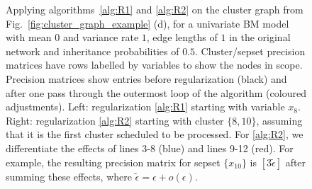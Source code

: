 \begin{figure}[t]
    \centering
    \caption{Applying algorithms~\ref{alg:R1} and \ref{alg:R2} on the cluster graph from Fig.~\ref{fig:cluster_graph_example} (d), for a univariate BM model with mean $0$ and variance rate $1$, edge lengths of $1$ in the original network and inheritance probabilities of $0.5$. Cluster/sepset precision matrices have rows labelled by variables to show the nodes in scope. Precision matrices show entries before regularization (black) and after one pass through the outermost loop of the algorithm (coloured adjustments). Left: regularization \ref{alg:R1} starting with variable $x_8$. Right: regularization \ref{alg:R2} starting with cluster $\{8, 10\}$, assuming that it is the first cluster scheduled to be processed. For \ref{alg:R2}, we differentiate the effects of lines 3-8 (blue) and lines 9-12 (red). For example, the resulting precision matrix for sepset $\{x_{10}\}$ is $[3\tilde{\epsilon}]$ after summing these effects, where $\tilde{\epsilon}=\epsilon+o(\epsilon)$.
    }
    \label{fig:regularization}
\end{figure}